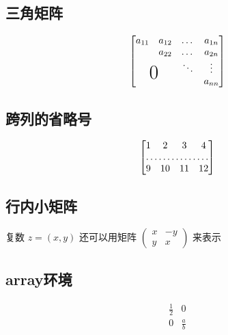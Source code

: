 \documentclass{article}
\begin{document}
	\subsection{三角矩阵}
	\[
	\begin{bmatrix}
		a_{11} & a_{12} & \dots & a_{1n} \\
		       & a_{22} & \dots & a_{2n} \\
		       &   		& \ddots& \vdots \\
		\multicolumn{2}{c}{\raisebox{1.3 ex}[0 pt]{\huge 0}} &       & a_{nn} 
	\end{bmatrix}
	\]
	
	\subsection{跨列的省略号}%
	\[
	\begin{bmatrix}
		1&2&3&4\\
		\hdotsfor{4}\\
		9&10&11&12
	\end{bmatrix}
	\]
	
	\subsection{行内小矩阵}
	复数 $z=(x,y)$ 还可以用矩阵
	\begin{math}
		\left(%
		\begin{smallmatrix}
			x&-y\\y&x
		\end{smallmatrix}
		\right)%
	\end{math}
	来表示
	
	\subsection{array环境}
	\[
	\begin{array}{c|c}
		\frac{1}{2} & 0 \\
		\hline
		0 & \frac{a}{b}
	\end{array}
	\]
	
\end{document}

